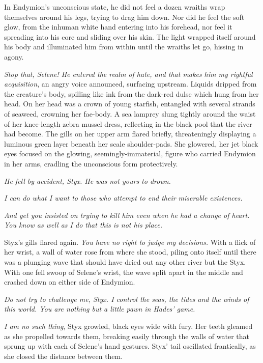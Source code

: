 In Endymion’s unconscious state, he did not feel a dozen wraiths wrap themselves around his legs, trying to drag him down. Nor did he feel the soft glow, from the inhuman white hand entering into his forehead, nor feel it spreading into his core and sliding over his skin. The light wrapped itself around his body and illuminated him from within until the wraiths let go, hissing in agony.

\emph{Stop that, Selene! He entered the realm of hate, and that makes him my rightful acquisition}, an angry voice announced, surfacing upstream. Liquids dripped from the creature’s body, spilling like ink from the dark-red dulse which hung from her head. On her head was a crown of young starfish, entangled with several strands of seaweed, crowning her fae-body. A sea lamprey slung tightly around the waist of her knee-length zebra mussel dress, reflecting in the black pool that the river had become. The gills on her upper arm flared briefly, threateningly displaying a luminous green layer beneath her scale shoulder-pads. She glowered, her jet black eyes focused on the glowing, seemingly-immaterial, figure who carried Endymion in her arms, cradling the unconscious form protectively.

\emph{He fell by accident, Styx. He was not yours to drown.}

\emph{I can do what I want to those who attempt to end their miserable existences.}

\emph{And yet you insisted on trying to kill him even when he had a change of heart. You know as well as I do that this is not his place.}

Styx’s gills flared again. \emph{You have no right to judge my decisions.} With a flick of her wrist, a wall of water rose from where she stood, piling onto itself until there was a plunging wave that should have dried out any other river but the Styx. With one fell swoop of Selene’s wrist, the wave split apart in the middle and crashed down on either side of Endymion.

\emph{Do not try to challenge me, Styx. I control the seas, the tides and the winds of this world. You are nothing but a little pawn in Hades’ game.}

\emph{I am no such thing}, Styx growled, black eyes wide with fury. Her teeth gleamed as she propelled towards them, breaking easily through the walls of water that sprung up with each of Selene’s hand gestures. Styx’ tail oscillated frantically, as she closed the distance between them.

